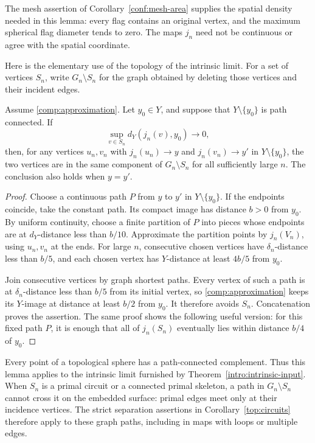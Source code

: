 The mesh assertion of Corollary~\ref{conf:mesh-area} supplies the
spatial density needed in this lemma: every flag contains an original
vertex, and the maximum spherical flag diameter tends to zero.  The
maps $j_n$ need not be continuous or agree with the spatial coordinate.

Here is the elementary use of the topology of the intrinsic limit.
For a set of vertices $S_n$, write $G_n\setminus S_n$ for the graph
obtained by deleting those vertices and their incident edges.

\begin{lemma}
\label{comp:avoid-separator}
Assume \eqref{comp:approximation}.  Let $y_0\in Y$, and suppose that
$Y\setminus\{y_0\}$ is path connected.  If
\[
 \sup_{v\in S_n}d_Y(j_n(v),y_0)\longrightarrow0,
\]
then, for any vertices $u_n,v_n$ with
$j_n(u_n)\to y$ and $j_n(v_n)\to y'$ in
$Y\setminus\{y_0\}$, the two vertices are in the same component of
$G_n\setminus S_n$ for all sufficiently large $n$.
The conclusion also holds when $y=y'$.
\end{lemma}

\begin{proof}
Choose a continuous path $P$ from $y$ to $y'$ in
$Y\setminus\{y_0\}$.  If the endpoints coincide, take the constant
path.  Its compact image has distance $b>0$ from $y_0$.  By uniform
continuity, choose a finite partition of $P$ into pieces whose
endpoints are at $d_Y$-distance less than $b/10$.  Approximate the
partition points by $j_n(V_n)$, using $u_n,v_n$ at the ends.  For large
$n$, consecutive chosen vertices have $\delta_n$-distance less than
$b/5$, and each chosen vertex has $Y$-distance at least $4b/5$ from
$y_0$.

Join consecutive vertices by graph shortest paths.  Every vertex of
such a path is at $\delta_n$-distance less than $b/5$ from its initial
vertex, so \eqref{comp:approximation} keeps its $Y$-image at distance
at least $b/2$ from $y_0$.  It therefore avoids $S_n$.  Concatenation
proves the assertion.  The same proof shows the following useful
version: for this fixed path $P$, it is enough that all of $j_n(S_n)$
eventually lies within distance $b/4$ of $y_0$.
\end{proof}

Every point of a topological sphere has a path-connected complement.
Thus this lemma applies to the intrinsic limit furnished by
Theorem~\ref{intro:intrinsic-input}.  When $S_n$ is a primal circuit
or a connected primal skeleton, a path in $G_n\setminus S_n$ cannot
cross it on the embedded surface: primal edges meet only at their
incidence vertices.  The strict separation assertions in
Corollary~\ref{top:circuits} therefore apply to these graph paths,
including in maps with loops or multiple edges.

